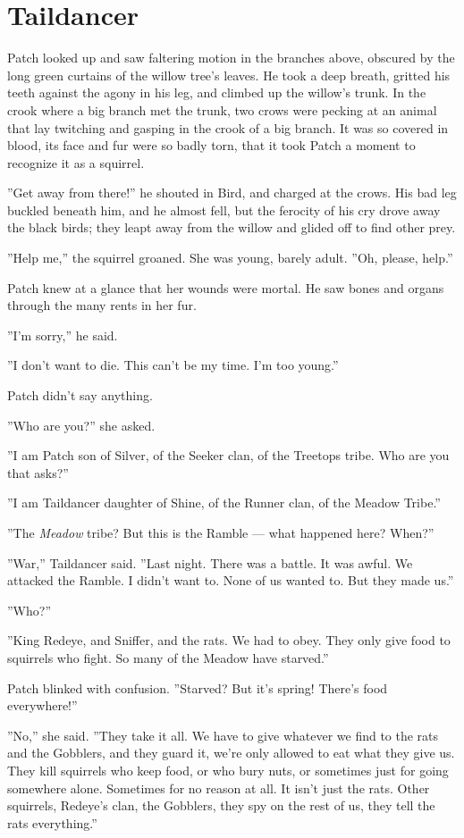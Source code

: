 \documentclass[12pt]{book}
\begin{document}

\section{Taildancer}

Patch looked up and saw faltering motion in the branches above,
obscured by the long green curtains of the willow tree's leaves. He
took a deep breath, gritted his teeth against the agony in his leg,
and climbed up the willow's trunk. In the crook where a big branch met
the trunk, two crows were pecking at an animal that lay twitching and
gasping in the crook of a big branch. It was so covered in blood, its
face and fur were so badly torn, that it took Patch a moment to
recognize it as a squirrel.

''Get away from there!'' he shouted in Bird, and charged at the
crows. His bad leg buckled beneath him, and he almost fell, but the
ferocity of his cry drove away the black birds; they leapt away from
the willow and glided off to find other prey.

''Help me,'' the squirrel groaned. She was young, barely adult. ''Oh,
please, help.''

Patch knew at a glance that her wounds were mortal. He saw bones and
organs through the many rents in her fur.

''I'm sorry,'' he said.

''I don't want to die. This can't be my time. I'm too young.''

Patch didn't say anything.

''Who are you?'' she asked.

''I am Patch son of Silver, of the Seeker clan, of the Treetops
tribe. Who are you that asks?''

''I am Taildancer daughter of Shine, of the Runner clan, of the Meadow
Tribe.''

''The \textit{Meadow} tribe? But this is the Ramble --- what happened
here? When?''

''War,'' Taildancer said. ''Last night. There was a battle. It was
awful. We attacked the Ramble. I didn't want to. None of us wanted
to. But they made us.''

''Who?''

''King Redeye, and Sniffer, and the rats. We had to obey. They only
give food to squirrels who fight. So many of the Meadow have
starved.''

Patch blinked with confusion. ''Starved? But it's spring! There's food
everywhere!''

''No,'' she said. ''They take it all. We have to give whatever we find
to the rats and the Gobblers, and they guard it, we're only allowed to
eat what they give us. They kill squirrels who keep food, or who bury
nuts, or sometimes just for going somewhere alone. Sometimes for no
reason at all. It isn't just the rats. Other squirrels, Redeye's clan,
the Gobblers, they spy on the rest of us, they tell the rats
everything.''
\end{document}
